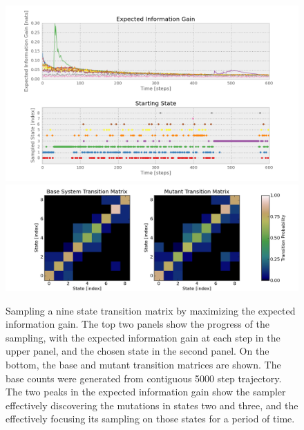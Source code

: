 \documentclass[twocolumn,floatfix,nofootinbib,aps]{revtex4-1}
\begin{document}
\begin{figure}[h]
\centering
\includegraphics[width=7in]{../code/9x9graph/plots/information_gain.png}
\includegraphics[width=7in]{../code/9x9graph/plots/transition_matricies.png}
\caption{Sampling a nine state transition matrix by maximizing the expected information gain. The top two panels show the progress of the sampling, with the expected information gain at each step in the upper panel, and the chosen state in the second panel. On the bottom, the base and mutant transition matrices are shown. The base counts were generated from contiguous 5000 step trajectory. The two peaks in the expected information gain show the sampler effectively discovering the mutations in states two and three, and the effectively focusing its sampling on those states for a period of time.}
\end{figure}
\end{document}
